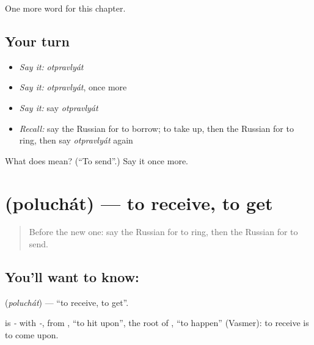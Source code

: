 \begin{grammarlens}[title={What you've built}]
One more word for this chapter.
\end{grammarlens}

\subsection*{Your turn}
\begin{itemize}
\raggedright
  \item \emph{Say it:} \emph{otpravlyát}
  \item \emph{Say it:} \emph{otpravlyát}, once more
  \item \emph{Say it:} say \emph{otpravlyát}
  \item \emph{Recall:} say the Russian for to borrow; to take up, then the Russian for to ring, then say \emph{otpravlyát} again
\end{itemize}

\begin{tcolorbox}[breakable,colback=teal!4,colframe=teal!35!black,title={Before you move on}]
What does  mean? (\textquotedblleft{}To send\textquotedblright{}.) Say it once more.
\end{tcolorbox}
\section[\texorpdfstring{\ru{получать} (poluchát)}{получать (poluchát)}]{ (poluchát) — to receive, to get}

\label{lesson:RU-C232-poluchat}



\begin{quote}
Before the new one: say the Russian for to ring, then the Russian for to send.
\end{quote}

\subsection*{You'll want to know: }
\textbf{} (\emph{poluchát}) — \textquotedblleft{}to receive, to get\textquotedblright{}.

\begin{cousinweb}
\textbf{} is \emph{-} with \emph{-}, from \emph{}, \textquotedblleft{}to hit upon\textquotedblright{}, the root of \emph{}, \textquotedblleft{}to happen\textquotedblright{} (Vasmer): to receive is to come upon.
\end{cousinweb}

